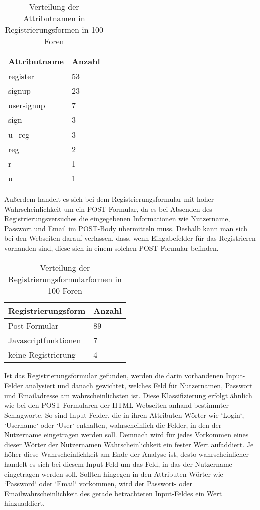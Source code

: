 \begin{table}[h!]
\centering 
\begin{tabular}{ | p{3cm} | p{3cm}|} \hline
Attributname & Anzahl \\ \hline
register & 53 \\ \hline
signup & 23 \\ \hline
usersignup & 7 \\ \hline
sign & 3 \\ \hline
u\_reg & 3 \\ \hline
reg & 2 \\ \hline
r & 1 \\ \hline
u & 1 \\ \hline
\end{tabular}
\caption{Verteilung der Attributnamen in Registrierungsformen in 100 Foren}
\end{table}



Außerdem handelt es sich bei dem Registrierungsformular mit hoher Wahrscheinlichkeit um ein POST-Formular, da es bei Absenden des Registrierungsversuches die eingegebenen Informationen wie Nutzername, Passwort und Email im POST-Body übermitteln muss.
Deshalb kann man sich bei den Webseiten darauf verlassen, dass, wenn Eingabefelder für das Registrieren vorhanden sind, diese sich in einem solchen POST-Formular befinden.

\begin{table}[h!]
\centering 
\begin{tabular}{ | p{5cm} | p{3cm}|} \hline
Registrierungsform & Anzahl \\ \hline
Post Formular & 89 \\ \hline
Javascriptfunktionen & 7 \\ \hline
keine Registrierung & 4 \\ \hline
\end{tabular}
\caption{Verteilung der Registrierungsformularformen in 100 Foren}
\end{table}


Ist das Registrierungsformular gefunden, werden die darin vorhandenen Input-Felder analysiert und danach gewichtet, welches Feld für Nutzernamen, Passwort und Emailadresse am wahrscheinlichsten ist.
Diese Klassifizierung erfolgt ähnlich wie bei den POST-Formularen der HTML-Webseiten anhand bestimmter Schlagworte.
So sind Input-Felder, die in ihren Attributen Wörter wie `Login`, `Username` oder `User` enthalten, wahrscheinlich die Felder, in den der Nutzername eingetragen werden soll. Demnach wird für jedes Vorkommen eines dieser Wörter der Nutzernamen Wahrscheinlichkeit ein fester Wert aufaddiert. Je höher diese Wahrscheinlichkeit am Ende der Analyse ist, desto wahrscheinlicher handelt es sich bei diesem Input-Feld um das Feld, in das der Nutzername eingetragen werden soll. Sollten hingegen in den Attributen Wörter wie `Password` oder `Email` vorkommen, wird der Passwort- oder Emailwahrscheinlichkeit des gerade betrachteten Input-Feldes ein Wert hinzuaddiert.

